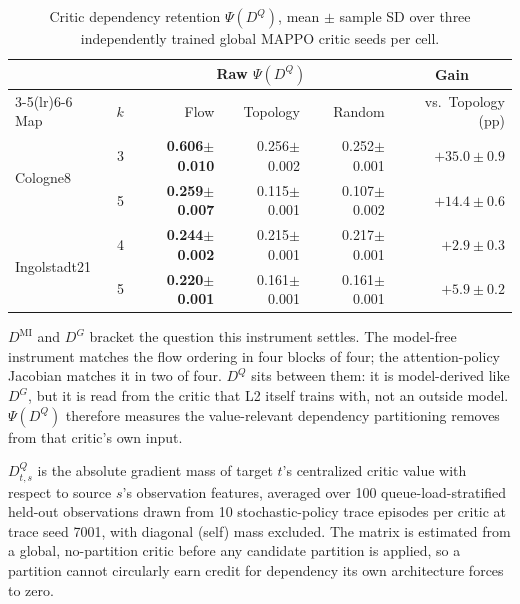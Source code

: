 \documentclass[journal]{IEEEtran}
\theoremstyle{definition}
\begin{document}
\begin{table}[t]
    \centering
    \caption{Critic dependency retention $\Psi(D^Q)$, mean $\pm$ sample SD
        over three independently trained global MAPPO critic seeds per
        cell.}
    \label{tab:psi-dq}
    \scriptsize
    \setlength{\tabcolsep}{2.5pt}
    \begin{tabular}{lrrrrr}
        \toprule
                                      &     & \multicolumn{3}{c}{Raw $\Psi(D^Q)$} & \multicolumn{1}{c}{Gain}                                            \\
        \cmidrule(lr){3-5}\cmidrule(lr){6-6}
        Map                           & $k$ & Flow                                & Topology                 & Random          & vs.\ Topology (pp)     \\
        \midrule
        \multirow{2}{*}{Cologne8}     & 3   & \textbf{0.606$\pm$0.010}            & 0.256$\pm$0.002          & 0.252$\pm$0.001 & $\mathbf{+35.0\pm0.9}$ \\
                                      & 5   & \textbf{0.259$\pm$0.007}            & 0.115$\pm$0.001          & 0.107$\pm$0.002 & $\mathbf{+14.4\pm0.6}$ \\\midrule
        \multirow{2}{*}{Ingolstadt21} & 4   & \textbf{0.244$\pm$0.002}            & 0.215$\pm$0.001          & 0.217$\pm$0.001 & $\mathbf{+2.9\pm0.3}$  \\
                                      & 5   & \textbf{0.220$\pm$0.001}            & 0.161$\pm$0.001          & 0.161$\pm$0.001 & $\mathbf{+5.9\pm0.2}$  \\
        \bottomrule
    \end{tabular}
\end{table}

$D^{\mathrm{MI}}$ and $D^{G}$ bracket the question this instrument settles.
The model-free instrument matches the flow ordering in four blocks of four; the attention-policy Jacobian matches it in two of four. $D^{Q}$ sits between them: it is model-derived like $D^{G}$, but it is read from the critic that L2 itself trains with, not an outside model. $\Psi(D^{Q})$ therefore measures the value-relevant dependency partitioning removes from that critic's own input.

$D^Q_{t,s}$ is the absolute gradient mass of target $t$'s centralized critic value with respect to source $s$'s observation features, averaged over 100 queue-load-stratified held-out observations drawn from 10 stochastic-policy trace episodes per critic at trace seed 7001, with diagonal (self) mass excluded.
The matrix is estimated from a global, no-partition critic before any candidate partition is applied, so a partition cannot circularly earn credit for dependency its own architecture forces to zero.
\end{document}
